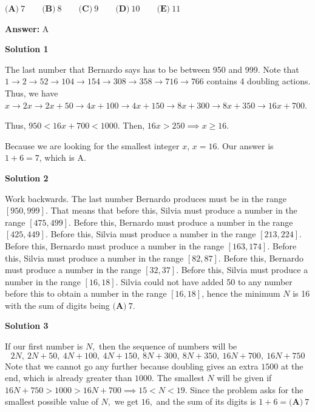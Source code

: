 \begin{enumerate}
 $\textbf{(A)}\ 7\qquad\textbf{(B)}\ 8\qquad\textbf{(C)}\ 9\qquad\textbf{(D)}\ 10\qquad\textbf{(E)}\ 11$

 \textbf{Answer: }A



\textbf{Solution 1}

The last number that Bernardo says has to be between 950 and 999. Note that $1\rightarrow 2\rightarrow 52\rightarrow 104\rightarrow 154\rightarrow 308\rightarrow 358\rightarrow 716\rightarrow 766$ contains 4 doubling actions. Thus, we have $x \rightarrow 2x \rightarrow 2x+50 \rightarrow 4x+100 \rightarrow 4x+150 \rightarrow 8x+300 \rightarrow 8x+350 \rightarrow 16x+700$. 

 Thus, $950<16x+700<1000$. Then, $16x>250 \implies x \geq 16$. 

 Because we are looking for the smallest integer $x$, $x=16$. Our answer is $1+6=\boxed{7}$, which is A.

 



\textbf{Solution 2}

Work backwards. The last number Bernardo produces must be in the range $[950,999]$. That means that before this, Silvia must produce a number in the range $[475,499]$. Before this, Bernardo must produce a number in the range $[425,449]$. Before this, Silvia must produce a number in the range $[213,224]$. Before this, Bernardo must produce a number in the range $[163,174]$. Before this, Silvia must produce a number in the range $[82,87]$. Before this, Bernardo must produce a number in the range $[32,37]$. Before this, Silvia must produce a number in the range $[16,18]$. Silvia could not have added 50 to any number before this to obtain a number in the range $[16,18]$, hence the minimum $N$ is 16 with the sum of digits being $\boxed{\textbf{(A)}\ 7}$.

 



\textbf{Solution 3}

If our first number is $N,$ then the sequence of numbers will be 
 \[2N,~2N+50,~4N+100,~4N+150,~8N+300,~8N+350,~16N+700,~16N+750\] Note that we cannot go any further because doubling gives an extra $1500$ at the end, which is already greater than $1000.$ The smallest $N$ will be given if $16N+750>1000>16N+700 \implies 15<N<19.$ Since the problem asks for the smallest possible value of $N,$ we get $16,$ and the sum of its digits is $1+6=\boxed{\textbf{(A)}~7}$





\end{enumerate}
